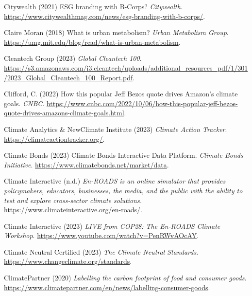 \documentclass[
  letterpaper,
  DIV=11,
  numbers=noendperiod]{scrartcl}
\newlength{\cslhangindent}
\newenvironment{CSLReferences}[2] %
 {\begin{list}{}{%
  \setlength{\itemindent}{0pt}
  \setlength{\leftmargin}{0pt}
  \setlength{\parsep}{0pt}
  \ifodd #1
   \setlength{\leftmargin}{\cslhangindent}
   \setlength{\itemindent}{-1\cslhangindent}
  \fi
  \setlength{\itemsep}{#2\baselineskip}}}
 {\end{list}}
\begin{document}
\begin{CSLReferences}{0}{1}
Citywealth (2021) {ESG} branding with {B-Corps}? \emph{Citywealth}.
\url{https://www.citywealthmag.com/news/esg-branding-with-b-corps/}.

Claire Moran (2018) What is urban metabolism? \emph{Urban Metabolism
Group}. \url{https://umg.mit.edu/blog/read/what-is-urban-metabolism}.

Cleantech Group (2023) \emph{Global {Cleantech} 100}.
\url{https://s3.amazonaws.com/i3.cleantech/uploads/additional_resources_pdf/1/301/2023_Global_Cleantech_100_Report.pdf}.

Clifford, C. (2022) How this popular {Jeff Bezos} quote drives
{Amazon}'s climate goals. \emph{CNBC}.
\url{https://www.cnbc.com/2022/10/06/how-this-popular-jeff-bezos-quote-drives-amazons-climate-goals.html}.

Climate Analytics \& NewClimate Institute (2023) \emph{Climate {Action
Tracker}}. \url{https://climateactiontracker.org/}.

Climate Bonds (2023) Climate {Bonds Interactive Data Platform}.
\emph{Climate Bonds Initiative}.
\url{https://www.climatebonds.net/market/data}.

Climate Interactive (n.d.) \emph{En-{ROADS} is an online simulator that
provides policymakers, educators, businesses, the media, and the public
with the ability to test and explore cross-sector climate solutions.}
\url{https://www.climateinteractive.org/en-roads/}.

Climate Interactive (2023) \emph{{LIVE} from {COP28}: {The En-ROADS
Climate Workshop}}. \url{https://www.youtube.com/watch?v=PenRWvAOcAY}.

Climate Neutral Certified (2023) \emph{The {Climate Neutral Standards}}.
\url{https://www.changeclimate.org/standards}.

ClimatePartner (2020) \emph{Labelling the carbon footprint of food and
consumer goods}.
\url{https://www.climatepartner.com/en/news/labelling-consumer-goods}.


\end{CSLReferences}
\end{document}
